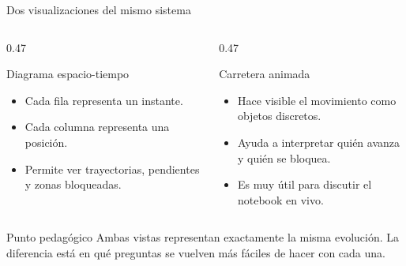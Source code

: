 \begin{frame}{Dos visualizaciones del mismo sistema}
\begin{columns}[T,onlytextwidth]
\begin{column}{0.47\textwidth}
\begin{block}{Diagrama espacio-tiempo}
\begin{itemize}
    \item Cada fila representa un instante.
    \item Cada columna representa una posición.
    \item Permite ver trayectorias, pendientes y zonas bloqueadas.
\end{itemize}
\end{block}
\end{column}
\begin{column}{0.47\textwidth}
\begin{block}{Carretera animada}
\begin{itemize}
    \item Hace visible el movimiento como objetos discretos.
    \item Ayuda a interpretar quién avanza y quién se bloquea.
    \item Es muy útil para discutir el notebook en vivo.
\end{itemize}
\end{block}
\end{column}
\end{columns}

\vspace{0.2cm}
\begin{alertblock}{Punto pedagógico}
Ambas vistas representan exactamente la misma evolución. La diferencia está en qué preguntas se vuelven más fáciles de hacer con cada una.
\end{alertblock}
\end{frame}

